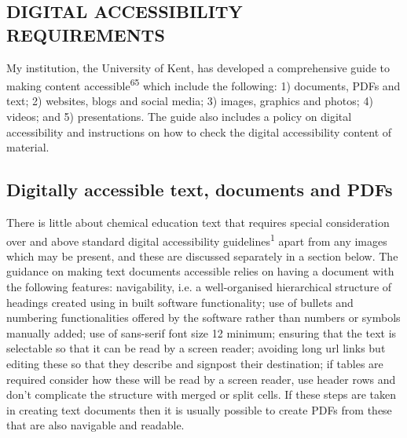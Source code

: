 \documentclass[11.5pt]{sig-alternate} %
\begin{document}
\begin{large}
\section*{DIGITAL ACCESSIBILITY REQUIREMENTS}
My institution, the University of Kent, has developed a comprehensive guide to making content accessible\textsuperscript{65} which include the following: 1) documents, PDFs and text; 2) websites, blogs and social media; 3) images, graphics and photos; 4) videos; and 5) presentations. The guide also includes a policy on digital accessibility and instructions on how to check the digital accessibility content of material.

\subsection*{Digitally accessible text, documents and PDFs}
There is little about chemical education text that requires special consideration over and above standard digital accessibility guidelines\textsuperscript{1} apart from any images which may be present, and these are discussed separately in a section below. The guidance on making text documents accessible relies on having a document with the following features: navigability, i.e. a well-organised hierarchical structure of headings created using in built software functionality; use of bullets and numbering functionalities offered by the software rather than numbers or symbols manually added; use of sans-serif font size 12 minimum; ensuring that the text is selectable so that it can be read by a screen reader; avoiding long url links but editing these so that they describe and signpost their destination; if tables are required consider how these will be read by a screen reader, use header rows and don’t complicate the structure with merged or split cells. If these steps are taken in creating text documents then it is usually possible to create PDFs from these that are also navigable and readable.


\end{large}
\end{document}
